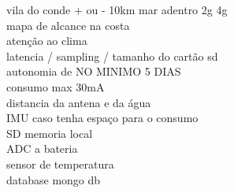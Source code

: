 vila do conde + ou - 10km mar adentro 2g 4g\\

mapa de alcance na costa\\

atenção ao clima \\

latencia / sampling / tamanho do cartão sd\\ 
autonomia de NO MINIMO 5 DIAS \\
    consumo max 30mA \\
distancia da antena e da água \\
IMU caso tenha espaço para o consumo \\
SD memoria local \\
ADC a bateria \\
sensor de temperatura \\
database mongo db \\
